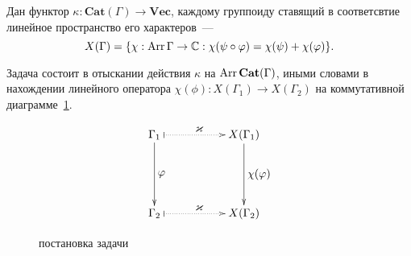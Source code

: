 
    Дан функтор $\kappa : \mathbf{Cat}(\Gamma) \to \mathbf{Vec}$, каждому 
    группоиду ставящий в соответсвтие линейное пространство его характеров~--- 
    \[X(\Gamma) = \{\chi: \operatorname*{Arr} \Gamma \to \mathbb{C}: \chi(\psi \circ \varphi) = 
    \chi(\psi) + \chi(\varphi)\}.\]

    Задача состоит в отыскании действия $\kappa$ на $\operatorname*{Arr} \mathbf{Cat}(\Gamma)$, 
    иными словами в нахождении линейного оператора $\chi(\phi) : X(\Gamma_1) 
    \to X(\Gamma_2)$ на коммутативной диаграмме~\ref{cd_problem}.

    \begin{figure}[h]
        \centering
        \[\xymatrix{
            \Gamma_1 \ar[dd]^{\textstyle{\phi}} \ar@{|..>}[rr]^{\textstyle{\kappa}}    & & X(\Gamma_1) \ar[dd]^{\textstyle{\chi(\phi)}} \\
                                                                                & & \\
            \Gamma_2 \ar@{|..>}[rr]^{\textstyle{\kappa}}                               & & X(\Gamma_2)
        }\]
        \caption{постановка задачи}
        \label{cd_problem}
    \end{figure}